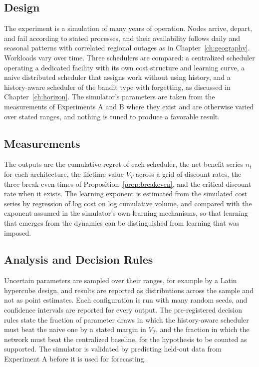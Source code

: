 \subsection*{Design}

The experiment is a simulation of many years of operation. Nodes arrive, depart, and fail according to stated processes, and their availability follows daily and seasonal patterns with correlated regional outages as in Chapter~\ref{ch:geography}. Workloads vary over time. Three schedulers are compared: a centralized scheduler operating a dedicated facility with its own cost structure and learning curve, a naive distributed scheduler that assigns work without using history, and a history-aware scheduler of the bandit type with forgetting, as discussed in Chapter~\ref{ch:horizon}. The simulator's parameters are taken from the measurements of Experiments A and B where they exist and are otherwise varied over stated ranges, and nothing is tuned to produce a favorable result.

\subsection*{Measurements}

The outputs are the cumulative regret of each scheduler, the net benefit series $n_t$ for each architecture, the lifetime value $V_T$ across a grid of discount rates, the three break-even times of Proposition~\ref{prop:breakeven}, and the critical discount rate when it exists. The learning exponent is estimated from the simulated cost series by regression of log cost on log cumulative volume, and compared with the exponent assumed in the simulator's own learning mechanisms, so that learning that emerges from the dynamics can be distinguished from learning that was imposed.

\subsection*{Analysis and Decision Rules}

Uncertain parameters are sampled over their ranges, for example by a Latin hypercube design, and results are reported as distributions across the sample and not as point estimates. Each configuration is run with many random seeds, and confidence intervals are reported for every output. The pre-registered decision rules state the fraction of parameter draws in which the history-aware scheduler must beat the naive one by a stated margin in $V_T$, and the fraction in which the network must beat the centralized baseline, for the hypothesis to be counted as supported. The simulator is validated by predicting held-out data from Experiment A before it is used for forecasting.

